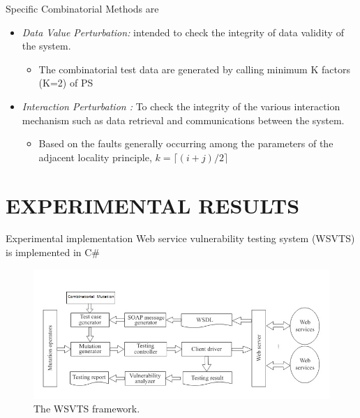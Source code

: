 \documentclass{bredelebeamer}
\begin{document}
\begin{frame}
	\large
	Specific Combinatorial Methods are
	\newline
	\begin{itemize}
		\large
		\item \textit{Data Value Perturbation:} intended
		to check the integrity of data validity of the system.
		\newline
		\begin{itemize}		
		\item The combinatorial test
		data are generated by calling minimum K factors (K=2) of PS
		\newline
		\end{itemize}
		
		\item \textit{Interaction Perturbation :}  To check the integrity of the various interaction mechanism such as data retrieval and communications between the system.\newline
		\begin{itemize}		
		\item Based on the faults generally occurring among the parameters of the adjacent locality principle, $ k=\lceil(i+j)/2 \rceil $
		\end{itemize}
	\end{itemize}
\end{frame}

\section{EXPERIMENTAL RESULTS}
\begin{frame}
\end{frame}

\begin{frame}{Experimental implementation}
	Web service vulnerability testing system (WSVTS) is implemented in C\# 
	\begin{figure}
\centering
\includegraphics[width=0.9\linewidth]{images/WS/Fig3}
\caption{The WSVTS framework.}
\label{fig:Fig3}
\end{figure}

\end{frame}
\end{document}
